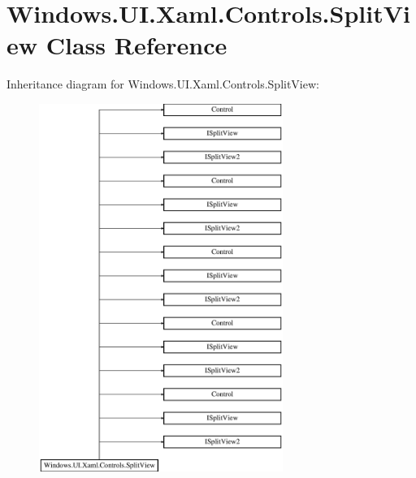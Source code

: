 \hypertarget{class_windows_1_1_u_i_1_1_xaml_1_1_controls_1_1_split_view}{}\section{Windows.\+U\+I.\+Xaml.\+Controls.\+Split\+View Class Reference}
\label{class_windows_1_1_u_i_1_1_xaml_1_1_controls_1_1_split_view}
Inheritance diagram for Windows.\+U\+I.\+Xaml.\+Controls.\+Split\+View\+:\begin{figure}[H]
\begin{center}
\leavevmode
\includegraphics[height=12.000000cm]{class_windows_1_1_u_i_1_1_xaml_1_1_controls_1_1_split_view}
\end{center}
\end{figure}
